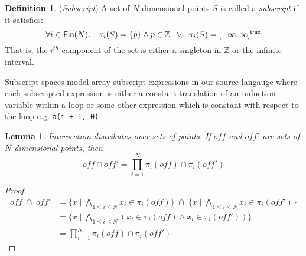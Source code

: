 \documentclass[acmlarge,review]{acmart}
\theoremstyle{definition}
\newtheorem{defn}{Definition}
\theoremstyle{plain}
\newtheorem{lem}{Lemma}
\theoremstyle{remark}
\begin{document}
%

\begin{defn}{(\emph{Subscript})}
  A set of $N$-dimensional points $S$ is called a \emph{subscript} if it
  satisfies:
%
\begin{equation*}
\forall i \in \textsf{Fin}(N) . \quad 
\pi_i (S) = \{p\} \wedge p \in \mathbb{Z} 
\;\;
\vee
\;\;
\pi_i (S) = \textnormal{$\lbrack-\infty,\infty\rbrack^{\mathsf{true}}$}
\end{equation*}
%
That is, the $i^{th}$ component of the set is either a singleton 
in $\mathbb{Z}$ or the infinite interval.

Subscript spaces model array subscript expressions in our source
langauge where each subscripted expression is either a 
constant translation of an induction variable within a loop or some
other expression which is constant with respect to the loop e.g. \texttt{a(i + 1, 0)}.
\end{defn}


\begin{lem}{}\label{lem:vector-intersect}
  Intersection distributes over sets of points. If $\mathit{off}$ and
  $\mathit{off'}$ are sets of $N$-dimensional points, then
%
  \begin{equation*}
    \mathit{off} \cap \mathit{off'} =
      \prod_{i = 1}^{N} \pi_i(\mathit{off}) \cap \pi_i(\mathit{off'})
  \end{equation*}
\end{lem}
%
\begin{proof}
  \begin{align*}
    \mathit{off} \; \cap \; \mathit{off'} &
    = \{x \mid \bigwedge_{1 \leq i \leq N } x_i \in \pi_i(\mathit{off}) \}
      \;\cap\;
      \{x \mid \bigwedge_{1 \leq i \leq N } x_i \in \pi_i(\mathit{off'}) \} \\
    & = \{x \mid \bigwedge_{1 \leq i \leq N }
      (x_i \in \pi_i(\mathit{off}) \wedge x_i \in \pi_i(\mathit{off'})) \} \\
    & = \prod_{i = 1}^{N} \pi_i(\mathit{off}) \cap \pi_i(\mathit{off'})
  \end{align*}
\end{proof}
\end{document}
